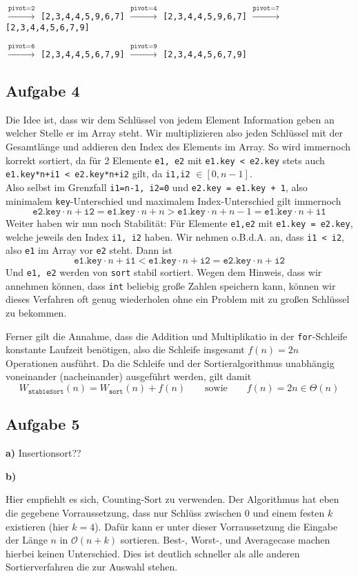 \documentclass[a4paper,graphics,11pt]{article}
\newcommand{\aufgabe}[1]{\subsection*{Aufgabe #1}}
\begin{document}
$\xrightarrow{\texttt{pivot=2}}$ \texttt{[2,3,4,4,5,9,6,7]}
$\xrightarrow{\texttt{pivot=4}}$ \texttt{[2,3,4,4,5,9,6,7]}
$\xrightarrow{\texttt{pivot=7}}$ \texttt{[2,3,4,4,5,6,7,9]}

$\xrightarrow{\texttt{pivot=6}}$ \texttt{[2,3,4,4,5,6,7,9]}
$\xrightarrow{\texttt{pivot=9}}$ \texttt{[2,3,4,4,5,6,7,9]}

\aufgabe{4}

Die Idee ist, dass wir dem Schlüssel von jedem Element Information geben an welcher Stelle er im Array steht. Wir multiplizieren
also jeden Schlüssel mit der Gesamtlänge und addieren den Index des Elements im Array. So wird immernoch korrekt sortiert,
da für 2 Elemente \texttt{e1, e2} mit \texttt{e1.key < e2.key} stets auch \texttt{e1.key*n+i1 < e2.key*n+i2} gilt, da
\texttt{i1,i2} $\in [0, n-1]$.\\
Also selbst im Grenzfall \texttt{i1=n-1, i2=0} und \texttt{e2.key = e1.key + 1}, also minimalem \texttt{key}-Unterschied
und maximalem Index-Unterschied gilt immernoch
$$
    \texttt{e2.key}\cdot n + \texttt{i2} = \texttt{e1.key}\cdot n + n > \texttt{e1.key}\cdot n + n-1 = \texttt{e1.key}\cdot n +\texttt{i1}
$$
Weiter haben wir nun noch Stabilität: Für Elemente \texttt{e1,e2} mit \texttt{e1.key = e2.key}, welche
jeweils den Index \texttt{i1, i2} haben. Wir nehmen o.B.d.A. an, dass \texttt{i1 < i2}, also \texttt{e1} im Array
vor \texttt{e2} steht. Dann ist
$$
    \texttt{e1.key}\cdot n + \texttt{i1} < \texttt{e1.key}\cdot n + \texttt{i2} = \texttt{e2.key}\cdot n + \texttt{i2}
$$
Und \texttt{e1, e2} werden von \texttt{sort} stabil sortiert. Wegen dem Hinweis, dass wir annehmen können, dass
\texttt{int} beliebig große Zahlen speichern kann, können wir dieses Verfahren oft genug wiederholen ohne ein Problem
mit zu großen Schlüssel zu bekommen.

Ferner gilt die Annahme, dass die Addition und Multiplikatio in der \texttt{for}-Schleife konstante Laufzeit benötigen,
also die Schleife insgesamt $f(n) = 2n$ Operationen ausführt. Da die Schleife und der Sortieralgorithmus unabhängig voneinander
(nacheinander) ausgeführt werden, gilt damit
$$
    W_{\texttt{stableSort}}(n) = W_{\texttt{sort}}(n) + f(n)
    \qquad\text{sowie}\qquad
    f(n) = 2n \in \Theta(n)
$$

\aufgabe{5}
\textbf{a)}
Insertionsort??

\newpage
\textbf{b)}

Hier empfiehlt es sich, Counting-Sort zu verwenden. Der Algorithmus hat eben die gegebene Vorraussetzung, dass
nur Schlüss zwischen $0$ und einem festen $k$ existieren (hier $k=4$). Dafür kann er unter dieser Vorraussetzung
die Eingabe der Länge $n$ in $\mathcal{O}(n+k)$ sortieren. Best-, Worst-, und Averagecase machen hierbei keinen Unterschied.
Dies ist deutlich schneller als alle anderen Sortierverfahren die zur Auswahl stehen.
\end{document}
